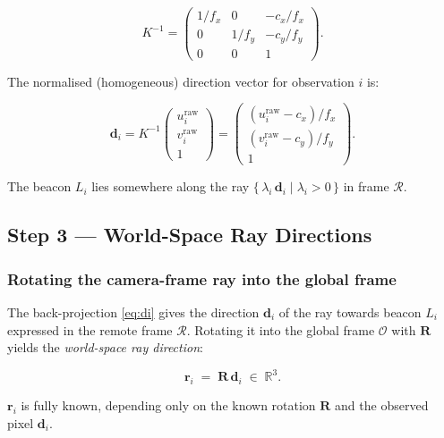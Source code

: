 \documentclass[12pt, a4paper]{article}
\begin{document}
\begin{equation}
K^{-1} =
\begin{pmatrix}
1/f_x & 0     & -c_x/f_x \\
0     & 1/f_y & -c_y/f_y \\
0     & 0     & 1
\end{pmatrix}.
\end{equation}

The normalised (homogeneous) direction vector for observation $i$ is:

\begin{equation}
\mathbf{d}_i = K^{-1}
\begin{pmatrix} u_i^{\text{raw}} \\ v_i^{\text{raw}} \\ 1 \end{pmatrix}
=
\begin{pmatrix}
(u_i^{\text{raw}} - c_x)/f_x \\
(v_i^{\text{raw}} - c_y)/f_y \\
1
\end{pmatrix}.
\label{eq:di}
\end{equation}

The beacon $L_i$ lies somewhere along the ray
$\{\,\lambda_i\,\mathbf{d}_i \mid \lambda_i > 0\,\}$ in frame $\mathcal{R}$.

\subsection{Step 3 — World-Space Ray Directions}

\subsubsection{Rotating the camera-frame ray into the global frame}
The back-projection \eqref{eq:di} gives the direction $\mathbf{d}_i$ of the
ray towards beacon $L_i$ expressed in the remote frame $\mathcal{R}$.
Rotating it into the global frame $\mathcal{O}$ with $\mathbf{R}$ yields the
\emph{world-space ray direction}:

\begin{equation}
\mathbf{r}_i \;=\; \mathbf{R}\,\mathbf{d}_i \;\in\; \mathbb{R}^3.
\label{eq:ri}
\end{equation}

$\mathbf{r}_i$ is fully known, depending only on the known rotation
$\mathbf{R}$ and the observed pixel $\mathbf{d}_i$.
\end{document}
